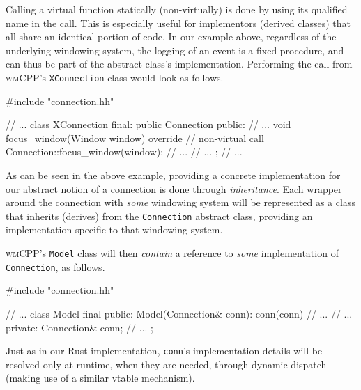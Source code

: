 Calling  a virtual  function statically  (non-virtually)  is done  by using  its
qualified name in the call. This  is especially useful for implementors (derived
classes) that  all share  an identical  portion of code.  In our  example above,
regardless of  the underlying  windowing system,  the logging of  an event  is a
fixed procedure,  and can thus be  part of the abstract  class's implementation.
Performing  the call  from \textsc{wmCPP}'s  \texttt{XConnection} class
would look as follows.

\begin{cppblock}
  #include "connection.hh"

  // ...
  class XConnection final: public Connection
  {
  public:
    // ...
    void focus_window(Window window) override {
      // non-virtual call
      Connection::focus_window(window);
      // ...
    }
    // ...
  };
  // ...
\end{cppblock}

As can  be seen in  the above example,  providing a concrete  implementation for
our  abstract  notion of  a  connection  is done  through  \textit{inheritance}.
Each  wrapper   around  the  connection  with   \textit{some}  windowing  system
will   be  represented   as   a   class  that   inherits   (derives)  from   the
\texttt{Connection}   abstract  class,   providing  an   implementation
specific to that windowing system.

\textsc{wmCPP}'s  \texttt{Model}  class  will then  \textit{contain}  a
reference  to \textit{some}  implementation of  \texttt{Connection}, as
follows.

\begin{cppblock}
  #include "connection.hh"

  // ...
  class Model final
  {
  public:
    Model(Connection& conn): conn(conn) {
      // ...
    }
    // ...
  private:
    Connection& conn;
    // ...
  };
\end{cppblock}

Just  as in  our  Rust  implementation, \texttt{conn}'s  implementation
details will be resolved only at  runtime, when they are needed, through dynamic
dispatch (making use of a similar vtable mechanism).\\


